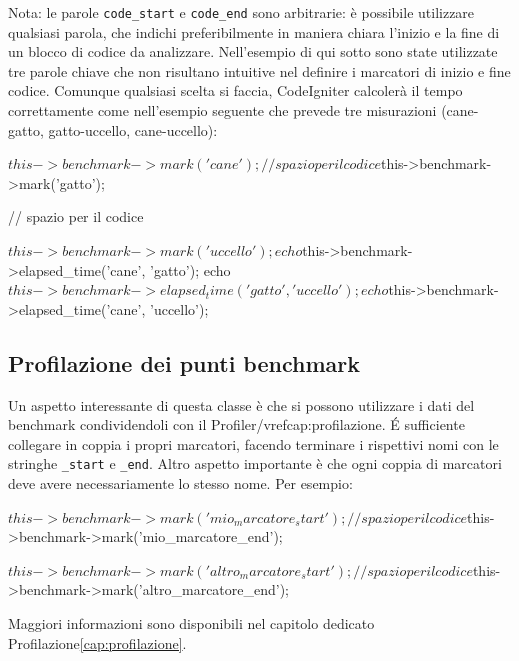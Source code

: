 Nota: le parole \verb|code_start| e \verb|code_end| sono arbitrarie: è possibile utilizzare qualsiasi parola, che indichi preferibilmente in maniera chiara l'inizio e la fine di un blocco di codice da analizzare. Nell'esempio di qui sotto sono state utilizzate tre parole chiave che non risultano intuitive nel definire i marcatori di inizio e fine codice. Comunque qualsiasi scelta si faccia, CodeIgniter calcolerà il tempo correttamente come nell'esempio seguente che prevede tre misurazioni (cane-gatto, gatto-uccello, cane-uccello):

\begin{code}
$this->benchmark->mark('cane');

// spazio per il codice

$this->benchmark->mark('gatto');

// spazio per il codice

$this->benchmark->mark('uccello');

echo $this->benchmark->elapsed_time('cane', 'gatto');
echo $this->benchmark->elapsed_time('gatto', 'uccello');
echo $this->benchmark->elapsed_time('cane', 'uccello');
\end{code}

\subsection*{Profilazione dei punti benchmark}
Un aspetto interessante di questa classe è che si possono utilizzare i dati del benchmark condividendoli con il Profiler/vref{cap:profilazione}. \'E sufficiente collegare in coppia i propri marcatori, facendo terminare i rispettivi nomi con le stringhe \verb|_start| e \verb|_end|. Altro aspetto importante è che ogni coppia di marcatori deve avere necessariamente lo stesso nome. Per esempio:

\begin{code}
$this->benchmark->mark('mio_marcatore_start');

// spazio per il codice

$this->benchmark->mark('mio_marcatore_end'); 

$this->benchmark->mark('altro_marcatore_start');

// spazio per il codice

$this->benchmark->mark('altro_marcatore_end');
\end{code}

Maggiori informazioni sono disponibili nel capitolo dedicato Profilazione\vref{cap:profilazione}.

